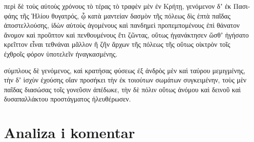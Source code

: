 {\large

\begin{greek}

\noindent περὶ δὲ τοὺς αὐτοὺς χρόνους τὸ τέρας τὸ τραφὲν μὲν ἐν Κρήτῃ, γενόμενον δʼ ἐκ Πασιφάης τῆς Ἡλίου θυγατρός, ᾧ κατὰ μαντείαν δασμὸν τῆς πόλεως δὶς ἑπτὰ παῖδας ἀποστελλούσης, ἰδὼν αὐτοὺς ἀγομένους καὶ πανδημεὶ προπεμπομένους ἐπὶ θάνατον ἄνομον καὶ προῦπτον καὶ πενθουμένους ἔτι ζῶντας, οὕτως ἠγανάκτησεν ὥσθʼ ἡγήσατο κρεῖττον εἶναι τεθνάναι μᾶλλον ἢ ζῆν ἄρχων τῆς πόλεως τῆς οὕτως οἰκτρὸν τοῖς ἐχθροῖς φόρον ὑποτελεῖν ἠναγκασμένης.


\noindent σύμπλους δὲ γενόμενος, καὶ κρατήσας φύσεως ἐξ ἀνδρὸς μὲν καὶ ταύρου μεμιγμένης, τὴν δʼ ἰσχὺν ἐχούσης οἵαν προσήκει τὴν ἐκ τοιούτων σωμάτων συγκειμένην, τοὺς μὲν παῖδας διασώσας τοῖς γονεῦσιν ἀπέδωκε, τὴν δὲ πόλιν οὕτως ἀνόμου καὶ δεινοῦ καὶ δυσαπαλλάκτου προστάγματος ἠλευθέρωσεν.

\end{greek}

}


\section*{Analiza i komentar}


